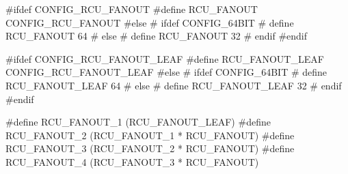 \begin{fcvlabel}
\begin{VerbatimN}[breaklines=true,commandchars=\%\@\$]
	#ifdef CONFIG_RCU_FANOUT
	#define RCU_FANOUT CONFIG_RCU_FANOUT
	#else
	# ifdef CONFIG_64BIT
	# define RCU_FANOUT 64
	# else
	# define RCU_FANOUT 32
	# endif
	#endif

	#ifdef CONFIG_RCU_FANOUT_LEAF     %
	#define RCU_FANOUT_LEAF CONFIG_RCU_FANOUT_LEAF
	#else
	# ifdef CONFIG_64BIT
	# define RCU_FANOUT_LEAF 64
	# else
	# define RCU_FANOUT_LEAF 32
	# endif
	#endif                            %

	#define RCU_FANOUT_1        (RCU_FANOUT_LEAF) %
	#define RCU_FANOUT_2        (RCU_FANOUT_1 * RCU_FANOUT)
	#define RCU_FANOUT_3        (RCU_FANOUT_2 * RCU_FANOUT)
	#define RCU_FANOUT_4        (RCU_FANOUT_3 * RCU_FANOUT) %


\end{VerbatimN}
\end{fcvlabel}
